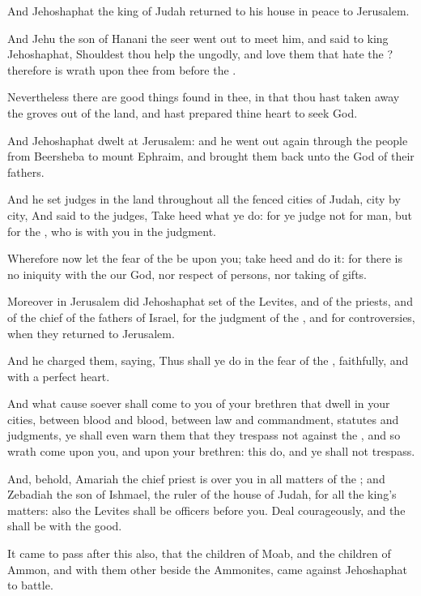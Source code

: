 \Chapter
\Verse And Jehoshaphat the king of Judah returned to his house in peace to Jerusalem.

\Verse And Jehu the son of Hanani the seer went out to meet him, and said to king Jehoshaphat, Shouldest thou help the ungodly, and love them that hate the \LORD? therefore is wrath upon thee from before the \LORD.

\Verse Nevertheless there are good things found in thee, in that thou hast taken away the groves out of the land, and hast prepared thine heart to seek God.

\Verse And Jehoshaphat dwelt at Jerusalem: and he went out again through the people from Beersheba to mount Ephraim, and brought them back unto the \LORD God of their fathers.

\Verse And he set judges in the land throughout all the fenced cities of Judah, city by city, \Verse And said to the judges, Take heed what ye do: for ye judge not for man, but for the \LORD, who is with you in the judgment.

\Verse Wherefore now let the fear of the \LORD be upon you; take heed and do it: for there is no iniquity with the \LORD our God, nor respect of persons, nor taking of gifts.

\Verse Moreover in Jerusalem did Jehoshaphat set of the Levites, and of the priests, and of the chief of the fathers of Israel, for the judgment of the \LORD, and for controversies, when they returned to Jerusalem.

\Verse And he charged them, saying, Thus shall ye do in the fear of the \LORD, faithfully, and with a perfect heart.

\Verse And what cause soever shall come to you of your brethren that dwell in your cities, between blood and blood, between law and commandment, statutes and judgments, ye shall even warn them that they trespass not against the \LORD, and so wrath come upon you, and upon your brethren: this do, and ye shall not trespass.

\Verse And, behold, Amariah the chief priest is over you in all matters of the \LORD; and Zebadiah the son of Ishmael, the ruler of the house of Judah, for all the king's matters: also the Levites shall be officers before you. Deal courageously, and the \LORD shall be with the good.


\Chapter
\Verse It came to pass after this also, that the children of Moab, and the children of Ammon, and with them other beside the Ammonites, came against Jehoshaphat to battle.

